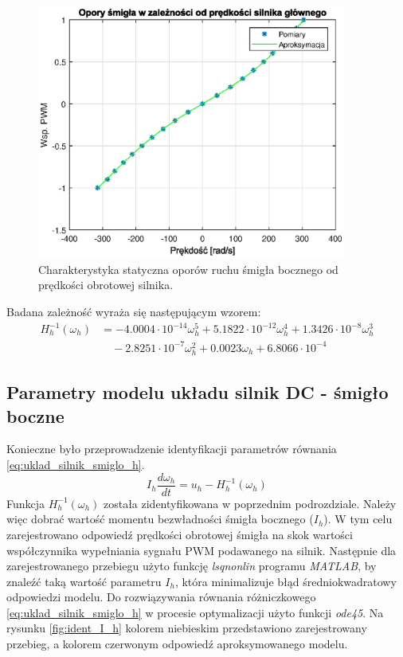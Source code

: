 \documentclass[11pt,a4paper]{article}
\begin{document}
\begin{figure}[H]
	\centering
	\includegraphics[width=4in]{Figures/char_U_V_az.eps}
	\caption{Charakterystyka statyczna oporów ruchu śmigła bocznego od prędkości obrotowej silnika.}
	\label{fig:char_U_V_az}
\end{figure}

Badana zależność wyraża się następującym wzorem:
\begin{equation}
\begin{aligned}
H_h^{-1}(\omega_h) &= -4.0004\cdot 10^{-14}\omega_h^5+5.1822\cdot 10^{-12}\omega_h^4+1.3426\cdot 10^{-8}\omega_h^3\\ & \quad -2.8251\cdot 10^{-7}\omega_h^2+0.0023\omega_h+6.8066\cdot 10^{-4}
\end{aligned}
\end{equation}

\subsection{Parametry modelu układu silnik DC - śmigło boczne}
Konieczne było przeprowadzenie identyfikacji parametrów równania \eqref{eq:uklad_silnik_smiglo_h}.
\begin{equation}
I_h\frac{d\omega_h}{dt} = u_h - H_h^{-1}(\omega_h)
\label{eq:uklad_silnik_smiglo_h}
\end{equation}
Funkcja \(H_h^{-1}(\omega_h)\) została zidentyfikowana w poprzednim podrozdziale. Należy więc dobrać wartość momentu bezwładności śmigła bocznego (\(I_h\)). W tym celu zarejestrowano odpowiedź prędkości obrotowej śmigła na skok wartości współczynnika wypełniania sygnału PWM podawanego na silnik. Następnie dla zarejestrowanego przebiegu użyto funkcję \textit{lsqnonlin} programu \textit{MATLAB}, by znaleźć taką wartość parametru \(I_h\), która minimalizuje błąd średniokwadratowy odpowiedzi modelu. Do rozwiązywania równania różniczkowego \eqref{eq:uklad_silnik_smiglo_h} w procesie optymalizacji użyto funkcji \textit{ode45}. Na rysunku \ref{fig:ident_I_h} kolorem niebieskim przedstawiono zarejestrowany przebieg, a kolorem czerwonym odpowiedź aproksymowanego modelu.
\end{document}
